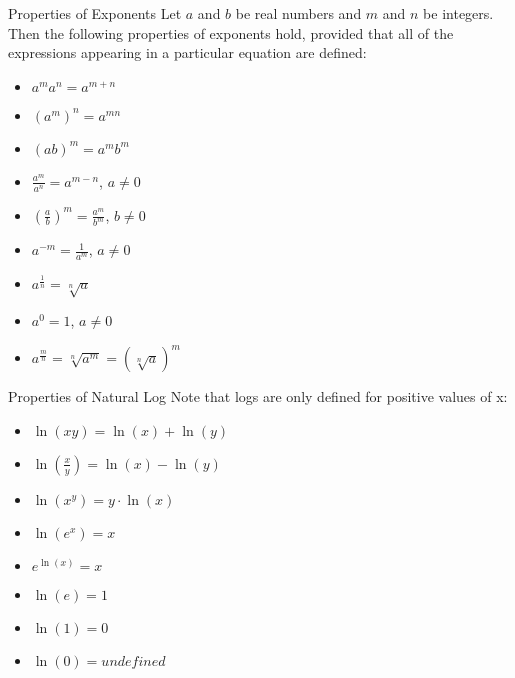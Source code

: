 \documentclass[aspectratio=169]{beamer}
\begin{document}
\begin{frame}{Properties of Exponents}\label{main1}
Let $a$ and $b$ be real numbers and $m$ and $n$ be integers. Then the following properties of exponents hold, provided that all of the expressions appearing in a particular equation are defined:
\begin{itemize}
\begin{itemize}
    \item $a^m a^n = a^{m+n}$
    \item $(a^m)^n = a^{mn}$
    \item $(ab)^m = a^m b^m$
    \item $\frac{a^m}{a^n} = a^{m-n}$, $a \neq 0$
    \item $\left(\frac{a}{b}\right)^m = \frac{a^m}{b^m}$, $b \neq 0$
    \item $a^{-m} = \frac{1}{a^m}$, $a \neq 0$
    \item $a^{\frac{1}{n}} = \sqrt[n]{a}$
    \item $a^0 = 1$, $a \neq 0$
    \item $a^{\frac{m}{n}} = \sqrt[n]{a^m} = \left(\sqrt[n]{a}\right)^m$
\end{itemize}
\end{itemize}
\end{frame}

\begin{frame}{Properties of Natural Log}\label{main1}
Note that logs are only defined for positive values of x:
\begin{itemize}
\begin{itemize}
    \item $\ln(xy) = \ln(x) + \ln(y)$
    \item $\ln\left(\frac{x}{y}\right) = \ln(x) - \ln(y)$
    \item $\ln(x^y) = y \cdot \ln(x)$
    \item $\ln(e^x) = x$
    \item $e^{\ln(x)} = x$
    \item $\ln(e) = 1$
    \item $\ln(1) = 0$
    \item $\ln(0) = undefined$
\end{itemize}
\end{itemize}
\end{frame}
\end{document}
